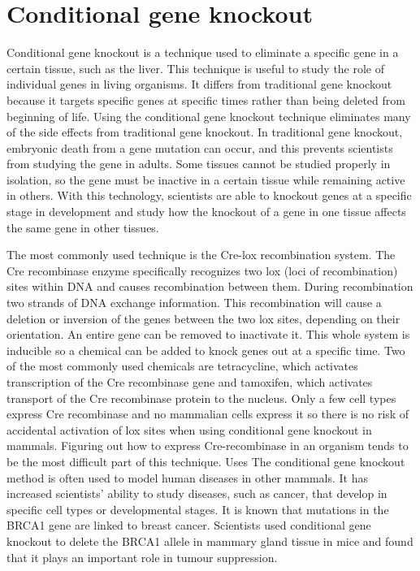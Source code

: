 \hypertarget{conditional-gene-knockout}{%
\section{Conditional gene knockout}\label{conditional-gene-knockout}}

Conditional gene knockout is a technique used to eliminate a specific gene in a certain tissue, such as the liver. This technique is useful to study the role of individual genes in living organisms. It differs from traditional gene knockout because it targets specific genes at specific times rather than being deleted from beginning of life. Using the conditional gene knockout technique eliminates many of the side effects from traditional gene knockout. In traditional gene knockout, embryonic death from a gene mutation can occur, and this prevents scientists from studying the gene in adults. Some tissues cannot be studied properly in isolation, so the gene must be inactive in a certain tissue while remaining active in others. With this technology, scientists are able to knockout genes at a specific stage in development and study how the knockout of a gene in one tissue affects the same gene in other tissues.

The most commonly used technique is the Cre-lox recombination system. The Cre recombinase enzyme specifically recognizes two lox (loci of recombination) sites within DNA and causes recombination between them. During recombination two strands of DNA exchange information. This recombination will cause a deletion or inversion of the genes between the two lox sites, depending on their orientation. An entire gene can be removed to inactivate it. This whole system is inducible so a chemical can be added to knock genes out at a specific time. Two of the most commonly used chemicals are tetracycline, which activates transcription of the Cre recombinase gene and tamoxifen, which activates transport of the Cre recombinase protein to the nucleus. Only a few cell types express Cre recombinase and no mammalian cells express it so there is no risk of accidental activation of lox sites when using conditional gene knockout in mammals. Figuring out how to express Cre-recombinase in an organism tends to be the most difficult part of this technique.
Uses
The conditional gene knockout method is often used to model human diseases in other mammals. It has increased scientists' ability to study diseases, such as cancer, that develop in specific cell types or developmental stages. It is known that mutations in the BRCA1 gene are linked to breast cancer. Scientists used conditional gene knockout to delete the BRCA1 allele in mammary gland tissue in mice and found that it plays an important role in tumour suppression.


